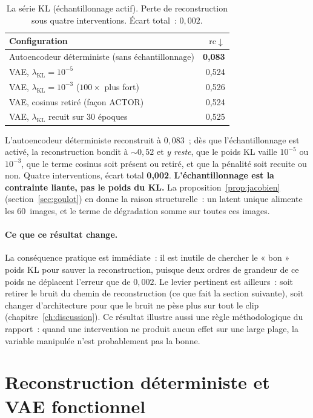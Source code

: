 \documentclass[12pt,a4paper,oneside]{report}
\theoremstyle{definition}
\theoremstyle{plain}
\newcommand{\rc}{\mathrm{rc}}
\newcommand{\lkl}{\ensuremath{\lambda_{\mathrm{KL}}}}
\begin{document}
\begin{table}[ht]
\centering
\caption{La série KL (échantillonnage actif). Perte de reconstruction sous quatre
interventions. Écart total~: $0{,}002$.}
\label{tab:kl}
\small
\begin{tabular}{@{}lr@{}}
\toprule
Configuration & $\rc\downarrow$ \\
\midrule
Autoencodeur déterministe (sans échantillonnage) & \textbf{0,083} \\
VAE, $\lkl=10^{-5}$ & 0,524 \\
VAE, $\lkl=10^{-3}$ ($100\times$ plus fort) & 0,526 \\
VAE, cosinus retiré (façon ACTOR) & 0,524 \\
VAE, $\lkl$ recuit sur 30 époques & 0,525 \\
\bottomrule
\end{tabular}
\end{table}

L'autoencodeur déterministe reconstruit à $0{,}083$~; dès que l'échantillonnage
est activé, la reconstruction bondit à ${\sim}0{,}52$ et \emph{y reste}, que le
poids KL vaille $10^{-5}$ ou $10^{-3}$, que le terme cosinus soit présent ou
retiré, et que la pénalité soit recuite ou non. Quatre interventions, écart total
\textbf{0,002}. \textbf{L'échantillonnage est la contrainte liante, pas le poids
du KL.} La proposition~\ref{prop:jacobien} (section~\ref{sec:goulot}) en donne la
raison structurelle~: un latent unique alimente les 60~images, et le terme de
dégradation somme sur toutes ces images.

\paragraph{Ce que ce résultat change.} La conséquence pratique est immédiate~: il
est inutile de chercher le « bon » poids KL pour sauver la reconstruction, puisque
deux ordres de grandeur de ce poids ne déplacent l'erreur que de $0{,}002$. Le
levier pertinent est ailleurs~: soit retirer le bruit du chemin de reconstruction
(ce que fait la section suivante), soit changer d'architecture pour que le bruit ne
pèse plus sur tout le clip (chapitre~\ref{ch:discussion}). Ce résultat illustre aussi
une règle méthodologique du rapport~: quand une intervention ne produit aucun effet
sur une large plage, la variable manipulée n'est probablement pas la bonne.

\section{Reconstruction déterministe et VAE fonctionnel}
\label{sec:vaefonc}
\end{document}
